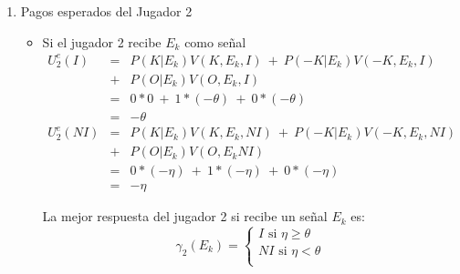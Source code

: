 {\begin{enumerate}
\begin{enumerate}
\begin{enumerate}
        \item Pagos esperados del Jugador 2
        \begin{itemize}
            \item Si el jugador 2 recibe $E_k$ como señal
            \begin{eqnarray*}
                U_{2}^{e}(I)&=&P(K|E_k)V(K,E_k,I)\ +\ P(-K|E_k)V(-K,E_k,I)\\ 
                            &+&P(O|E_k)V(O,E_k,I)\\
                            &=&0*0\ +\ 1*(-\theta)\ + \ 0*(-\theta)\\
                            &=&-\theta\\
                U_{2}^{e}(NI)&=&P(K|E_k)V(K,E_k,NI)\ +\ P(-K|E_k)V(-K,E_k,NI)\\ 
                             &+&P(O|E_k)V(O,E_kNI)\\
                             &=&0*(-\eta)\ +\ 1*(-\eta)\ + \ 0*(-\eta)\\
                             &=&-\eta
            \end{eqnarray*}

            La mejor respuesta del jugador 2 si recibe un señal $E_k$ es:
            \begin{equation*}
                \gamma_2(E_k)=
                \begin{cases}
                    I \text{ si } \eta \geq \theta \\
                    NI \text{ si } \eta < \theta \\
                \end{cases}    
            \end{equation*}
                

\end{itemize}
\end{enumerate}
\end{enumerate}
\end{enumerate}}

